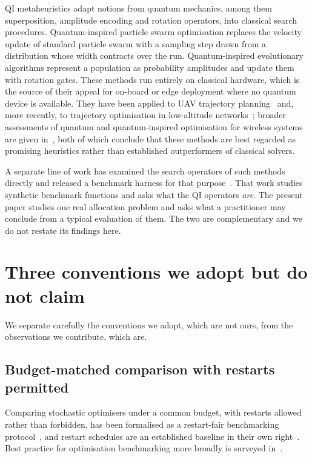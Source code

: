 \documentclass[runningheads]{llncs}
\begin{document}
QI metaheuristics adapt notions from quantum mechanics, among them superposition, amplitude
encoding and rotation operators, into classical search procedures. Quantum-inspired particle
swarm optimisation replaces the velocity update of standard particle swarm with a sampling step
drawn from a distribution whose width contracts over the run. Quantum-inspired evolutionary
algorithms represent a population as probability amplitudes and update them with rotation gates.
These methods run entirely on classical hardware, which is the source of their appeal for
on-board or edge deployment where no quantum device is available. They have been applied to UAV
trajectory planning~\cite{qpsouav} and, more recently, to trajectory optimisation in
low-altitude networks~\cite{qstate}; broader assessments of quantum and quantum-inspired
optimisation for wireless systems are given in~\cite{qwireless,qi6g}, both of which conclude
that these methods are best regarded as promising heuristics rather than established
outperformers of classical solvers.

A separate line of work has examined the search operators of such methods directly and released a
benchmark harness for that purpose~\cite{qideflation}. That work studies synthetic benchmark
functions and asks what the QI operators \emph{are}. The present paper studies one real
allocation problem and asks what a practitioner may conclude from a typical evaluation of them.
The two are complementary and we do not restate its findings here.

\section{Three conventions we adopt but do not claim}
\label{sec:conventions}

We separate carefully the conventions we adopt, which are not ours, from the observations we
contribute, which are.

\subsection{Budget-matched comparison with restarts permitted}

Comparing stochastic optimisers under a common budget, with restarts allowed rather than
forbidden, has been formalised as a restart-fair benchmarking protocol~\cite{restartfair}, and
restart schedules are an established baseline in their own right~\cite{greedyrestart}. Best
practice for optimisation benchmarking more broadly is surveyed in~\cite{benchbest}.
\end{document}
